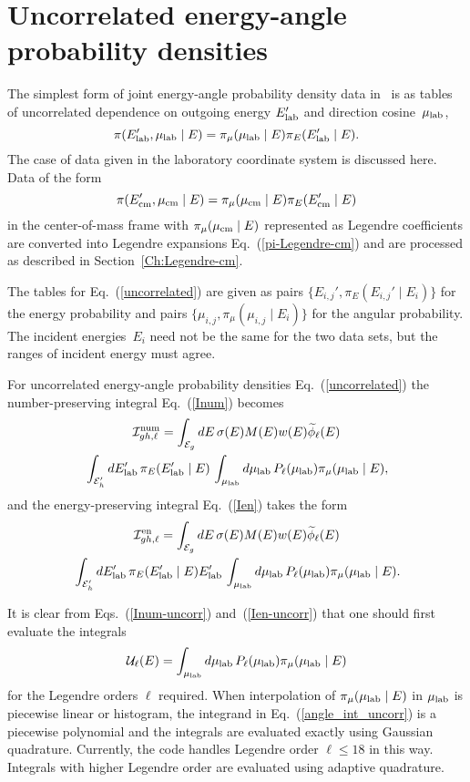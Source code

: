 \chapter{Uncorrelated energy-angle probability densities}
\label{Sec:uncorrelated-lab}
The simplest form of joint energy-angle probability density data in
\xendl\ is as tables of uncorrelated dependence on outgoing energy
$E_{\text{lab}}'  $ and direction cosine~$\mu_{\text{lab}}  $,
\begin{equation}
  \pi(E_{\text{lab}}'  , \mu_{\text{lab}}   \mid E) =
  \pi_\mu(\mu_{\text{lab}}   \mid E)\pi_E(E_{\text{lab}}'   \mid E).
   \label{uncorrelated}
\end{equation}
The case of data given in the laboratory coordinate system is discussed here.
Data of the form 
$$
 \pi(E_{\text{cm}}'  , \mu_{\text{cm}}   \mid E) =
  \pi_\mu(\mu_{\text{cm}}   \mid E)\pi_E(E_{\text{cm}}'   \mid E)
$$
in the center-of-mass frame
with $\pi_\mu(\mu_{\text{cm}}   \mid E)$ represented as Legendre coefficients
are converted into Legendre expansions Eq.~(\ref{pi-Legendre-cm}) and 
are processed as described in Section~\ref{Ch:Legendre-cm}.

The tables for Eq.~(\ref{uncorrelated})
are given as pairs $\{E_{i,j}', \pi_E(E_{i,j}' \mid E_i)\}$ for the energy probability
and pairs $\{\mu_{i,j}, \pi_\mu(\mu_{i,j} \mid E_i)\}$ for the angular probability.
The incident energies~$E_i$ need not be the same for the two data sets,
but the ranges of incident energy must agree.

For uncorrelated energy-angle probability densities
Eq.~(\ref{uncorrelated}) the number-preserving integral Eq.~(\ref{Inum}) becomes
\begin{multline}
   {\cal I}^{\text{num}}_{gh,\ell} =
        \int_{{\cal E}_g} dE \, \sigma ( E ) M(E) w(E) \widetilde \phi_\ell(E) \\
       \, \int_{{\cal E}_h' } dE_{\text{lab}}'   \, \pi_E(E_{\text{lab}}'   \mid E)
       \, \int_{\mu_{\text{lab}}}   d\mu_{\text{lab}}   \,  P_\ell( \mu_{\text{lab}}   ) \pi_\mu(\mu_{\text{lab}}   \mid E),
  \label{Inum-uncorr}
\end{multline}
and the energy-preserving integral Eq.~(\ref{Ien}) takes the form
\begin{multline}
  {\cal I}^{\text{en}}_{gh,\ell} =
     \int_{{\cal E}_g} dE \, \sigma ( E ) M(E) w(E) \widetilde \phi_\ell(E) \\
     \, \int_{{\cal E}_h' } dE_{\text{lab}}'   \, \pi_E(E_{\text{lab}}'   \mid E) E_{\text{lab}}'  
     \, \int_{\mu_{\text{lab}}}   d\mu_{\text{lab}}    \,  P_\ell ( \mu_{\text{lab}}   ) \pi_\mu(\mu_{\text{lab}}   \mid E).
  \label{Ien-uncorr}
\end{multline}

It is clear from Eqs.~(\ref{Inum-uncorr}) and~(\ref{Ien-uncorr}) that
one should first evaluate the integrals
\begin{equation}
  {\cal U}_\ell( E ) =  \int_{\mu_{\text{lab}}}   d\mu_{\text{lab}}   \, P_\ell ( \mu_{\text{lab}}   ) \pi_\mu(\mu_{\text{lab}}   \mid E)
  \label{angle_int_uncorr}
\end{equation}
for the Legendre orders $\ell$ required.  When interpolation of  $\pi_\mu(\mu_{\text{lab}}   \mid E)$
in $\mu_{\text{lab}}$ is piecewise linear or histogram, the integrand in Eq.~(\ref{angle_int_uncorr})
is a piecewise polynomial and the integrals are evaluated exactly using Gaussian quadrature.
Currently, the code handles Legendre order $\ell \le 18$ in this way.  Integrals with higher
Legendre order are evaluated using adaptive quadrature.

